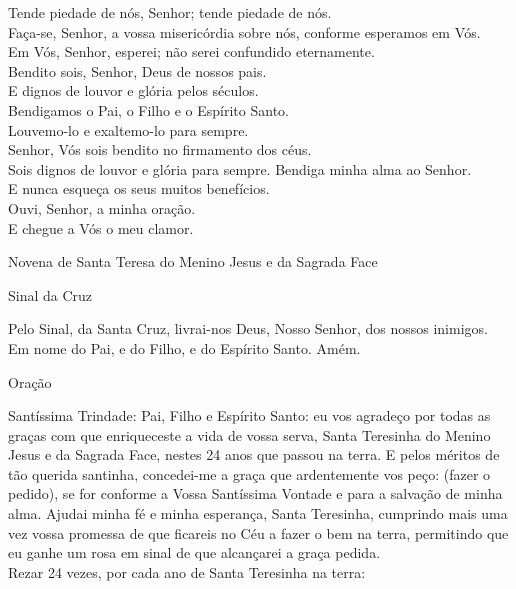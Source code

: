 \begin{flushleft}
    Tende piedade de nós, Senhor; tende piedade de nós. \\
    Faça-se, Senhor, a vossa misericórdia sobre nós, conforme esperamos em Vós. \\
    Em Vós, Senhor, esperei; não serei confundido eternamente.
    \vspace{.2cm} \\
    \VbarRed{} Bendito sois, Senhor, Deus de nossos pais. \\
    \RbarRed{} E dignos de louvor e glória pelos séculos.
    \vspace{.2cm} \\
    \VbarRed{} Bendigamos o Pai, o Filho e o Espírito Santo. \\
    \RbarRed{} Louvemo-lo e exaltemo-lo para sempre.
    \vspace{.2cm} \\
    \VbarRed{} Senhor, Vós sois bendito no firmamento dos céus. \\
    \RbarRed{} Sois dignos de louvor e glória para sempre.
    \newpage
    \VbarRed{} Bendiga minha alma ao Senhor. \\
    \RbarRed{} E nunca esqueça os seus muitos benefícios.
    \vspace{.2cm} \\
    \VbarRed{} Ouvi, Senhor, a minha oração. \\
    \RbarRed{} E chegue a Vós o meu clamor.
\end{flushleft}
\begin{center}
    Novena de Santa Teresa do Menino Jesus e da Sagrada Face
\end{center}
\begin{center}
    Sinal da Cruz
\end{center}
\begin{flushleft}
    Pelo Sinal, \grecrossRed{} da Santa Cruz, livrai-nos Deus, \grecrossRed{} Nosso Senhor, dos nossos \grecrossRed{} inimigos. Em nome do Pai, \grecrossRed{} e do Filho, e do Espírito Santo. Amém.
\end{flushleft}
\begin{center}
    Oração
\end{center}
\begin{flushleft}
    Santíssima Trindade: Pai, Filho e Espírito Santo: eu vos agradeço por todas as graças com que enriqueceste a vida de vossa serva, Santa Teresinha do Menino Jesus e da Sagrada Face, nestes 24 anos que passou na terra. E pelos méritos de tão querida santinha, concedei-me a graça que ardentemente vos peço: (\textcolor{VioletRed3}{fazer o pedido}), se for conforme a Vossa Santíssima Vontade e para a salvação de minha alma. Ajudai minha fé e minha esperança, Santa Teresinha, cumprindo mais uma vez vossa promessa de que ficareis no Céu a fazer o bem na terra, permitindo que eu ganhe um rosa em sinal de que alcançarei a graça pedida.
    \vspace{.2cm} \\
    Rezar 24 vezes, por cada ano de Santa Teresinha na terra:
\end{flushleft}
